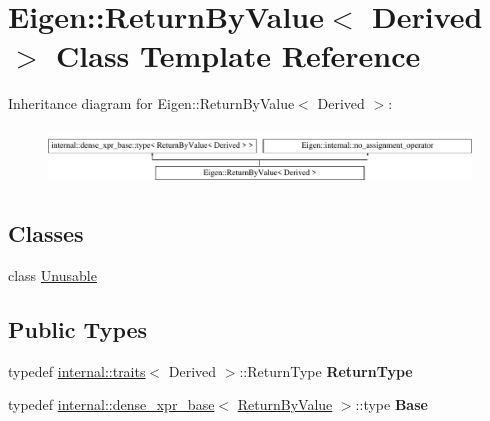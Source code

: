 \hypertarget{class_eigen_1_1_return_by_value}{}\section{Eigen\+::Return\+By\+Value$<$ Derived $>$ Class Template Reference}
\label{class_eigen_1_1_return_by_value}
Inheritance diagram for Eigen\+::Return\+By\+Value$<$ Derived $>$\+:\begin{figure}[H]
\begin{center}
\leavevmode
\includegraphics[height=1.517615cm]{class_eigen_1_1_return_by_value}
\end{center}
\end{figure}
\subsection*{Classes}
\begin{DoxyCompactItemize}
\item 
class \mbox{\hyperlink{class_eigen_1_1_return_by_value_1_1_unusable}{Unusable}}
\end{DoxyCompactItemize}
\subsection*{Public Types}
\begin{DoxyCompactItemize}
\item 
\mbox{\label{class_eigen_1_1_return_by_value_a60586d6c0903b626b5336158811c33ec}} 
typedef \mbox{\hyperlink{struct_eigen_1_1internal_1_1traits}{internal\+::traits}}$<$ Derived $>$\+::Return\+Type {\bfseries Return\+Type}
\item 
\mbox{\label{class_eigen_1_1_return_by_value_a5175aa7230bb630e7755fee20c2cd3a3}} 
typedef \mbox{\hyperlink{struct_eigen_1_1internal_1_1dense__xpr__base}{internal\+::dense\+\_\+xpr\+\_\+base}}$<$ \mbox{\hyperlink{class_eigen_1_1_return_by_value}{Return\+By\+Value}} $>$\+::type {\bfseries Base}
\end{DoxyCompactItemize}
